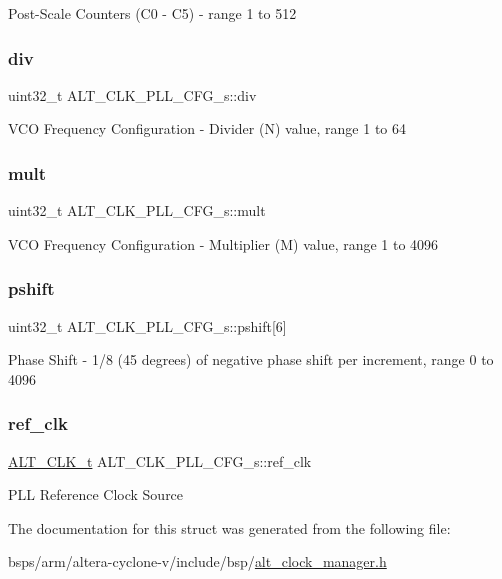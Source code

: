 Post-\/\+Scale Counters (C0 -\/ C5) -\/ range 1 to 512 \mbox{\label{structALT__CLK__PLL__CFG__s_a574ab0d09cac840c00da844e64f47ec9}} 
\subsubsection{\texorpdfstring{div}{div}}
{\footnotesize\ttfamily uint32\+\_\+t A\+L\+T\+\_\+\+C\+L\+K\+\_\+\+P\+L\+L\+\_\+\+C\+F\+G\+\_\+s\+::div}

V\+CO Frequency Configuration -\/ Divider (N) value, range 1 to 64 \mbox{\label{structALT__CLK__PLL__CFG__s_a07ae3f01764da8dda3ee5c64a084a178}} 
\subsubsection{\texorpdfstring{mult}{mult}}
{\footnotesize\ttfamily uint32\+\_\+t A\+L\+T\+\_\+\+C\+L\+K\+\_\+\+P\+L\+L\+\_\+\+C\+F\+G\+\_\+s\+::mult}

V\+CO Frequency Configuration -\/ Multiplier (M) value, range 1 to 4096 \mbox{\label{structALT__CLK__PLL__CFG__s_a07022afe293b77cd14d621dd0a789fb6}} 
\subsubsection{\texorpdfstring{pshift}{pshift}}
{\footnotesize\ttfamily uint32\+\_\+t A\+L\+T\+\_\+\+C\+L\+K\+\_\+\+P\+L\+L\+\_\+\+C\+F\+G\+\_\+s\+::pshift\mbox{[}6\mbox{]}}

Phase Shift -\/ 1/8 (45 degrees) of negative phase shift per increment, range 0 to 4096 \mbox{\label{structALT__CLK__PLL__CFG__s_abd8e872e3e1a626d376f4fd689c01f85}} 
\subsubsection{\texorpdfstring{ref\_clk}{ref\_clk}}
{\footnotesize\ttfamily \mbox{\hyperlink{group__CLK__MGR_ga4cdb80e84284365fe3d47c2f8050b13d}{A\+L\+T\+\_\+\+C\+L\+K\+\_\+t}} A\+L\+T\+\_\+\+C\+L\+K\+\_\+\+P\+L\+L\+\_\+\+C\+F\+G\+\_\+s\+::ref\+\_\+clk}

P\+LL Reference Clock Source 

The documentation for this struct was generated from the following file\+:\begin{DoxyCompactItemize}
\item 
bsps/arm/altera-\/cyclone-\/v/include/bsp/\mbox{\hyperlink{alt__clock__manager_8h}{alt\+\_\+clock\+\_\+manager.\+h}}\end{DoxyCompactItemize}

